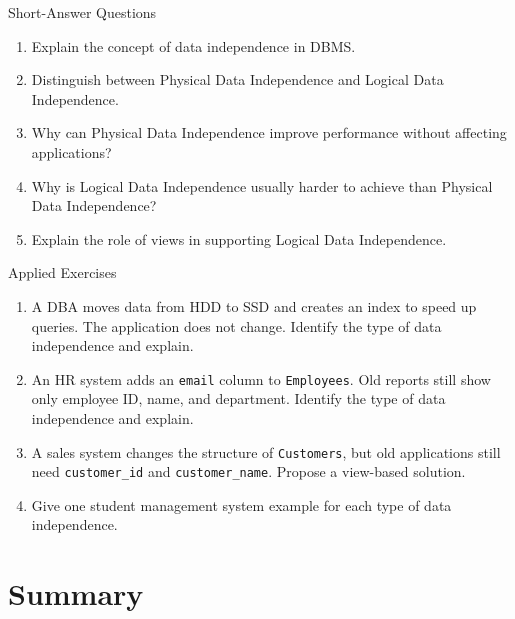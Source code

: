 \documentclass[aspectratio=169,11pt]{beamer}
\begin{document}
\begin{frame}{Short-Answer Questions}
\begin{enumerate}
  \item Explain the concept of data independence in DBMS.
  \item Distinguish between Physical Data Independence and Logical Data Independence.
  \item Why can Physical Data Independence improve performance without affecting applications?
  \item Why is Logical Data Independence usually harder to achieve than Physical Data Independence?
  \item Explain the role of views in supporting Logical Data Independence.
\end{enumerate}
\end{frame}

\begin{frame}{Applied Exercises}
\begin{enumerate}
  \item A DBA moves data from HDD to SSD and creates an index to speed up queries. The application does not change. Identify the type of data independence and explain.
  \item An HR system adds an \texttt{email} column to \texttt{Employees}. Old reports still show only employee ID, name, and department. Identify the type of data independence and explain.
  \item A sales system changes the structure of \texttt{Customers}, but old applications still need \texttt{customer\_id} and \texttt{customer\_name}. Propose a view-based solution.
  \item Give one student management system example for each type of data independence.
\end{enumerate}
\end{frame}

\section{Summary}
\end{document}
